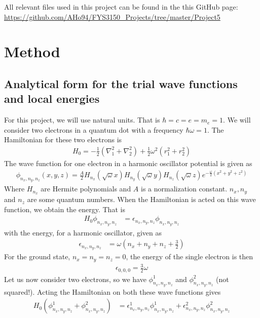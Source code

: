 \documentclass[12pt]{article}
\begin{document}
All relevant files used in this project can be found in the this GitHub page:
\url{https://github.com/AHo94/FYS3150_Projects/tree/master/Project5}
\section{Method} \label{section:method}
\subsection{Analytical form for the trial wave functions and local energies}
For this project, we will use natural units. That is $\hbar = c = e = m_e = 1$.
We will consider two electrons in a quantum dot with a frequency $\hbar \omega = 1$. The Hamiltonian for these two electrons is
\begin{align*}
H_0 = -\frac{1}{2}(\nabla_1^2 + \nabla_2^2) + \frac{1}{2}\omega^2(r_1^2 + r_2^2)
\end{align*}
The wave function for one electron in a harmonic oscillator potential is given as
\begin{align*}
\phi_{n_x, n_y, n_z}(x,y,z) = \frac{A}{2}H_{n_x}(\sqrt{\omega} x)H_{n_y}(\sqrt{\omega}y)H_{n_z}(\sqrt{\omega}z)e^{-\frac{\omega}{2}(x^2+y^2+z^2)}
\end{align*}
Where $H_{n_x}$ are Hermite polynomials and $A$ is a normalization constant. $n_x, n_y$ and $n_z$ are some quantum numbers. When the Hamiltonian is acted on this wave function, we obtain the energy. That is
\begin{align*}
H_0\phi_{n_x, n_y, n_z} &= \epsilon_{n_x, n_y, n_z}\phi_{n_x, n_y, n_z}
\end{align*}
with the energy, for a harmonic oscillator, given as
\begin{align*}
\epsilon_{n_x, n_y, n_z} &= \omega\left(n_x + n_y + n_z + \frac{3}{2} \right)
\end{align*}
For the ground state, $n_x = n_y = n_z = 0$, the energy of the single electron is then
\begin{align*}
\epsilon_{0,0,0} = \frac{3}{2}\omega
\end{align*}
Let us now consider two electrons, so we have $\phi_{n_x, n_y, n_z}^1$ and $\phi_{n_x, n_y, n_z}^2$ (not squared!). Acting the Hamiltonian on both these wave functions gives
\begin{align*}
H_0(\phi_{n_x, n_y, n_z}^1 + \phi_{n_x, n_y, n_z}^2) &= \epsilon_{n_x, n_y, n_z}^1\phi_{n_x, n_y, n_z}^1 + \epsilon_{n_x, n_y, n_z}^2\phi_{n_x, n_y, n_z}^2 
\end{align*}
\end{document}
